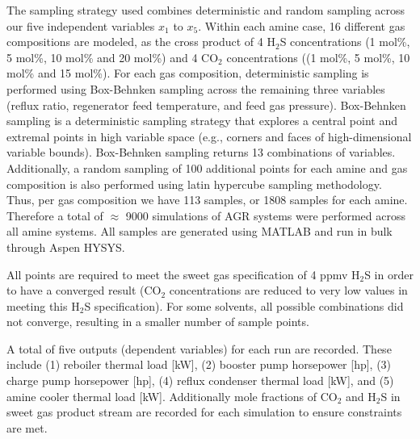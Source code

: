 \documentclass[11pt]{report}
\begin{document}
The sampling strategy used combines deterministic and random sampling across our five independent variables $x_1$ to $x_5$. Within each amine case, 16 different gas compositions are modeled, as the cross product of 4 H$_2$S concentrations (1 mol\%, 5 mol\%, 10 mol\% and 20 mol\%) and 4 CO$_2$ concentrations ((1 mol\%, 5 mol\%, 10 mol\% and 15 mol\%). For each gas composition, deterministic sampling is performed using Box-Behnken sampling across the remaining three variables (reflux ratio, regenerator feed temperature, and feed gas pressure). Box-Behnken sampling is a deterministic sampling strategy that explores a central point and extremal points in high variable space (e.g., corners and faces of high-dimensional variable bounds). Box-Behnken sampling returns 13 combinations of variables. Additionally, a random sampling of 100 additional points for each amine and gas composition is also performed using latin hypercube sampling methodology. Thus, per gas composition we have 113 samples, or 1808 samples for each amine. Therefore a total of $\approx$ 9000 simulations of AGR systems were performed across all amine systems. All samples are generated using MATLAB \cite{Mathworks2016} and run in bulk through Aspen HYSYS.  

All points are required to meet the sweet gas specification of 4 ppmv H$_2$S in order to have a converged result (CO$_2$ concentrations are reduced to very low values in meeting this H$_2$S specification).  For some solvents, all possible combinations did not converge, resulting in a smaller number of sample points.
 
A total of five outputs (dependent variables) for each run are recorded. These include (1) reboiler thermal load [kW], (2) booster pump horsepower [hp], (3) charge pump horsepower [hp], (4) reflux condenser thermal load [kW], and (5) amine cooler thermal load [kW]. Additionally mole fractions of CO$_2$ and H$_2$S in sweet gas product stream are recorded for each simulation to ensure constraints are met.
\end{document}
